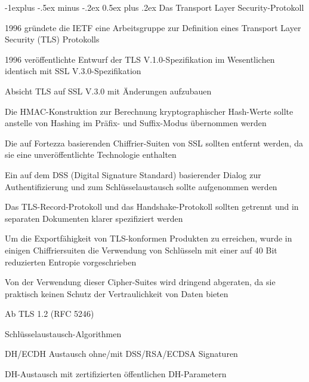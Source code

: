 \documentclass[a4paper]{article}
\makeatletter
\renewcommand{\subsection}{\@startsection{subsection}{2}{0mm}%
 {-1explus -.5ex minus -.2ex}%
 {0.5ex plus .2ex}%
 {\normalfont\normalsize\bfseries}}
\makeatother
\begin{document}
\begin{multicols}{3}
      \subsection{Das Transport Layer Security-Protokoll}
      \begin{itemize*}
            \item 1996 gründete die IETF eine Arbeitsgruppe zur Definition eines Transport Layer Security (TLS) Protokolls
            \item 1996 veröffentlichte Entwurf der TLS V.1.0-Spezifikation im Wesentlichen identisch mit SSL V.3.0-Spezifikation
            \item Absicht TLS auf SSL V.3.0 mit Änderungen aufzubauen
            \begin{itemize*}
                  \item Die HMAC-Konstruktion zur Berechnung kryptographischer Hash-Werte sollte anstelle von Hashing im Präfix- und Suffix-Modus übernommen werden
                  \item Die auf Fortezza basierenden Chiffrier-Suiten von SSL sollten entfernt werden, da sie eine unveröffentlichte Technologie enthalten
                  \item Ein auf dem DSS (Digital Signature Standard) basierender Dialog zur Authentifizierung und zum Schlüsselaustausch sollte aufgenommen werden
                  \item Das TLS-Record-Protokoll und das Handshake-Protokoll sollten getrennt und in separaten Dokumenten klarer spezifiziert werden
            \end{itemize*}
            \item Um die Exportfähigkeit von TLS-konformen Produkten zu erreichen, wurde in einigen Chiffriersuiten die Verwendung von Schlüsseln mit einer auf 40 Bit reduzierten Entropie vorgeschrieben
            \item Von der Verwendung dieser Cipher-Suites wird dringend abgeraten, da sie praktisch keinen Schutz der Vertraulichkeit von Daten bieten
            \item Ab TLS 1.2 (RFC 5246)
            \begin{itemize*}
                  \item Schlüsselaustausch-Algorithmen
                  \begin{itemize*}
                        \item DH/ECDH Austausch ohne/mit DSS/RSA/ECDSA Signaturen
                        \item DH-Austausch mit zertifizierten öffentlichen DH-Parametern

\end{itemize*}
\end{itemize*}
\end{itemize*}
\end{multicols}
\end{document}
